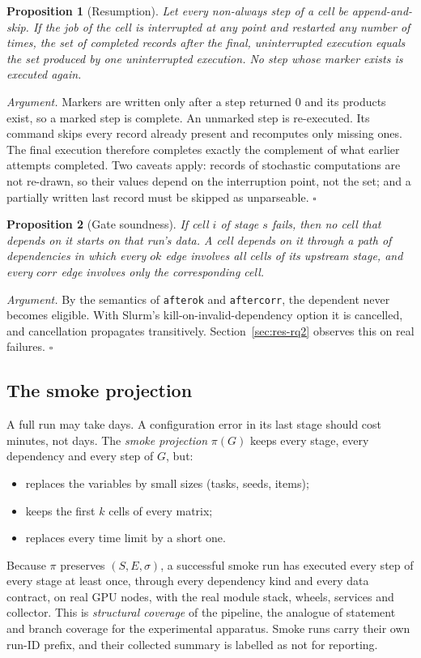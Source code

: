 \documentclass[pdflatex,sn-mathphys-num]{sn-jnl}
\theoremstyle{thmstyleone}%
\newtheorem{proposition}{Proposition}%
\theoremstyle{thmstyletwo}%
\theoremstyle{thmstylethree}%
\newcommand{\code}[1]{\texttt{#1}}
\begin{document}
\begin{proposition}[Resumption]\label{prop:resume}
Let every non-\emph{always} step of a cell be append-and-skip. If the job of
the cell is interrupted at any point and restarted any number of times, the
set of completed records after the final, uninterrupted execution equals the
set produced by one uninterrupted execution. No step whose marker exists is
executed again.
\end{proposition}
\noindent\emph{Argument.} Markers are written only after a step returned 0 and
its products exist, so a marked step is complete. An unmarked step is
re-executed. Its command skips every record already present and recomputes
only missing ones. The final execution therefore completes exactly the
complement of what earlier attempts completed. Two caveats apply: records of
stochastic computations are not re-drawn, so their values depend on the
interruption point, not the set; and a partially written last record must be
skipped as unparseable. \hfill$\square$

\begin{proposition}[Gate soundness]\label{prop:gate}
If cell $i$ of stage $s$ fails, then no cell that depends on it starts on that
run's data. A cell depends on it through a path of dependencies in which every
$\mathit{ok}$ edge involves all cells of its upstream stage, and every
$\mathit{corr}$ edge involves only the corresponding cell.
\end{proposition}
\noindent\emph{Argument.} By the semantics of \code{afterok} and
\code{aftercorr}, the dependent never becomes eligible. With Slurm's
kill-on-invalid-dependency option it is cancelled, and cancellation propagates
transitively. Section~\ref{sec:res-rq2}
observes this on real failures. \hfill$\square$

\subsection{The smoke projection}\label{sec:smoke}

A full run may take days. A configuration error in its last stage should cost
minutes, not days. The \emph{smoke projection} $\pi(G)$ keeps every stage,
every dependency and every step of $G$, but:
\begin{itemize}[leftmargin=1.4em, itemsep=1pt]
\item replaces the variables by small sizes (tasks, seeds, items);
\item keeps the first $k$ cells of every matrix;
\item replaces every time limit by a short one.
\end{itemize}
Because $\pi$ preserves $(S,E,\sigma)$, a successful smoke run has executed
every step of every stage at least once, through every dependency kind and
every data contract, on real GPU nodes, with the real module stack, wheels,
services and collector. This is \emph{structural coverage} of the pipeline,
the analogue of statement and branch coverage for the experimental apparatus.
Smoke runs carry their own run-ID prefix, and their collected summary is
labelled as not for reporting.
\end{document}
